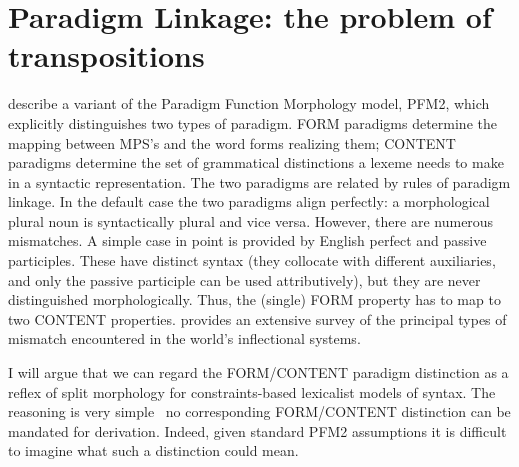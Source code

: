 \documentclass[output=paper,
modfonts
]{LSP/langsci}
\begin{document}
\section{Paradigm Linkage: the problem of transpositions} \label{section:linkage}


\textcite{Spencer:Stump13:Hungproncase} %
\parencite[see also][]{Bonami:Stump16:PFM,Stump16:book} %
describe a variant of the Paradigm Function Morphology model, PFM2, which explicitly distinguishes two types of paradigm. FORM paradigms determine the mapping between MPS’s and the word forms realizing them; CONTENT paradigms determine the set of grammatical distinctions a lexeme needs to make in a syntactic representation. The two paradigms are related by rules of paradigm linkage. In the default case the two paradigms align perfectly: a morphological plural noun is syntactically plural and vice versa. However, there are numerous mismatches. A simple case in point is provided by English perfect and passive participles. These have distinct syntax (they collocate with different auxiliaries, and only the passive participle can be used attributively), but they are never distinguished morphologically. Thus, the (single) FORM property %
\parencite[say, VFORM:en-ptcp, or the output of a function f\textsubscript{\textit{en}}, as in][]{Aronoff94:book} %
has to map to two CONTENT properties. \textcite{Stump16:book} provides an extensive survey of the principal types of mismatch encountered in the world’s inflectional systems.

I will argue that we can regard the FORM/CONTENT paradigm distinction as a reflex of split morphology for constraints-based lexicalist models of syntax. The reasoning is very simple \textemdash\ no corresponding FORM/CONTENT distinction can be mandated for derivation. Indeed, given standard PFM2 assumptions it is difficult to imagine what such a distinction could mean.
\end{document}
